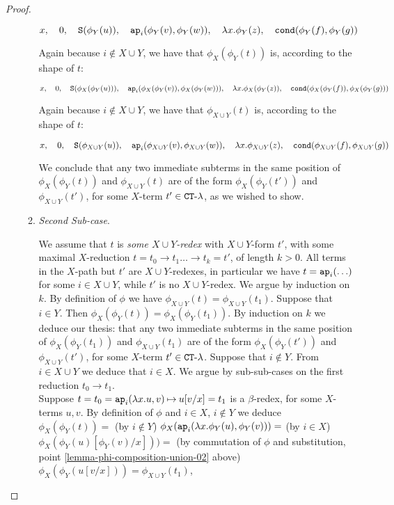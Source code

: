 \begin{proof}
\begin{enumerate}
\begin{enumerate}
$$ 
x, \ \ \ 
0, \ \ \  
\Succ(\phi_Y(u)),  \ \ \  
\ap_i(\phi_Y(v), \phi_Y(w)), \ \ \  
\lambda x.\phi_Y(z), \ \ \  
\cond(\phi_Y(f), \phi_Y(g))
$$

Again because $i \not \in X \cup Y$, 
we have that $\phi_{X}(\phi_{Y}(t))$ is, according to the shape of $t$:

$$ 
x, \ \ \ 
0, \ \ \  
\Succ(   \phi_X(\phi_Y(u))   ),  \ \ \  
\ap_i(  \phi_X(\phi_Y(v)),   \phi_X(\phi_Y(w))   ) , \ \ \  
\lambda x.   \phi_X(\phi_Y(z)), \ \ \  
\cond(   \phi_X(\phi_Y(f)), \phi_X(\phi_Y(g))  )
$$

Again because $i \not \in X \cup Y$, 
we have that $\phi_{X \cup Y}(t)$ is, according to the shape of $t$:

$$ 
x, \ \ \ 
0, \ \ \  
\Succ( \phi_{X \cup Y}(u)  ),  \ \ \  
\ap_i(  \phi_{X \cup Y}(v),   \phi_{X \cup Y}(w)   ) , \ \ \  
\lambda x.   \phi_{X \cup Y}(z), \ \ \  
\cond(   \phi_{X \cup Y}(f), \phi_{X \cup Y}(g)  )
$$

We conclude that any two immediate subterms in the same position of 
$\phi_{X}(\phi_{Y}(t)) $ and $\phi_{X \cup Y}(t)$ 
are of the form $\phi_{X}(\phi_{Y}(t')) $ and $\phi_{X \cup Y}(t')$, 
for some $X$-term $t' \in { {\tt CT}\mbox{-}\lambda}$, as we wished to show.

\item
\emph{Second Sub-case}.

We assume that $t$ is \emph{some $X \cup Y$-redex} with $X \cup Y$-form $t'$, 
with some maximal $X$-reduction
$t=t_0 \rightarrow t_1 \ldots \rightarrow t_k = t'$, of length $k>0$. All terms  
in the $X$-path but $t'$ are $X \cup Y$-redexes, in particular we have $t = {\tt ap}_i(\ldots)$
for some $i \in X \cup Y$,
while $t'$ is no $X \cup Y$-redex. We argue by induction on $k$. 
By definition of $\phi$ we have $\phi_{X \cup Y}(t) = \phi_{X \cup Y}(t_1)$.
Suppose that $i \in Y$. Then 
$\phi_X(\phi_Y(t)) = \phi_X(\phi_Y(t_1))$. 
By induction on $k$ we deduce our thesis:
that any two immediate subterms in the same position of 
$\phi_{X}(\phi_{Y}(t_1)) $ and $\phi_{X \cup Y}(t_1)$ 
are of the form $\phi_{X}(\phi_{Y}(t')) $ and $\phi_{X \cup Y}(t')$, 
for some $X$-term $t' \in { {\tt CT}\mbox{-}\lambda}$.
Suppose that $i \not \in Y$. From $i \in X \cup Y$ we deduce that $i \in X$. 
We argue by sub-sub-cases on the first reduction $t_0 \rightarrow t_1$.
\\

Suppose $t = t_0 = {\tt ap}_i(\lambda x.u,v) \mathbin{\mapsto} u[v/x] = t_1$ is a $\beta$-redex,
for some $X$-terms $u,v$. By definition of $\phi$ and $i \in X$, $i \not \in Y$ we deduce 
$
\phi_X(\phi_Y(t)) = 
$ (by $i \not \in Y$) $
\phi_X({\tt ap}_i(  \lambda x.\phi_Y(u),  \phi_Y(v)  )) = 
$ (by $i \in X$) $
\phi_X( \phi_Y(u)[\phi_Y(v)/x]  )) =
$ (by commutation of $\phi$ and substitution, point \ref{lemma-phi-composition-union-02} above) $
\phi_X( \phi_Y(u[v/x])  ) = 
\phi_{X \cup Y}(t_1)
$, 


\end{enumerate}
\end{enumerate}
\end{proof}
